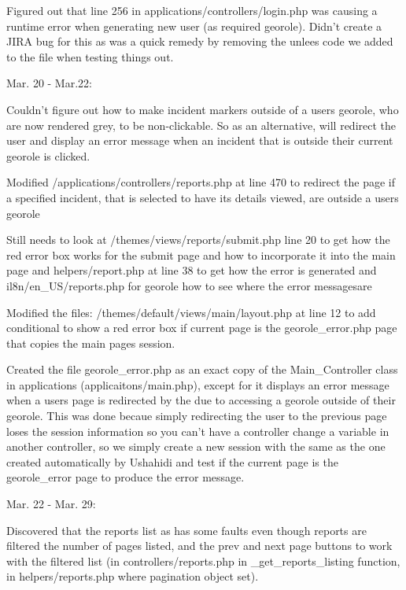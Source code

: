 \documentclass{article}
\begin{document}
    Figured out that line 256 in applications/controllers/login.php was causing a runtime error when generating
    new user (as required georole).  Didn't create a JIRA bug for this as was a quick remedy by removing
    the unlees code we added to the file when testing things out.
                      
Mar. 20 - Mar.22:

    Couldn't figure out how to make incident markers outside of a users georole, who are now rendered grey, to be
    non-clickable. So as an alternative, will redirect the user and display an error message when an incident that 
    is outside their current georole is clicked.
    
    Modified /applications/controllers/reports.php at line 470 to redirect the page
    if a specified incident, that is selected to have its details viewed, are outside a users georole
        
    Still needs to look at /themes/views/reports/submit.php line 20 to get how the red error box
    works for the submit page and how to incorporate it into the main page
    and helpers/report.php at line 38 to get how the error is generated
    and il8n/en_US/reports.php  for georole how to see where the error messagesare
        
    Modified the files: /themes/default/views/main/layout.php at line 12 to add conditional to show a red error
    box if current page is the georole_error.php page that copies the main pages session.
            
    Created the file georole_error.php as an exact copy of the Main_Controller class in applications (applicaitons/main.php),
    except for it displays an error message when a users page is redirected by the due to accessing a georole outside
    of their georole. This was done becaue simply redirecting the user to the previous page loses the session information
    so you can't have a controller change a variable in another controller, so we simply create a new session with the same
    as the one created automatically by Ushahidi and test if the current page is the georole_error page to produce the error message.

Mar. 22 - Mar. 29:

    Discovered that the reports list as has some faults even though reports are filtered the number of pages listed, and the prev 
    and next page buttons to work with the filtered list (in controllers/reports.php in _get_reports_listing function,
    in helpers/reports.php where pagination object set).
                     
\end{document}
